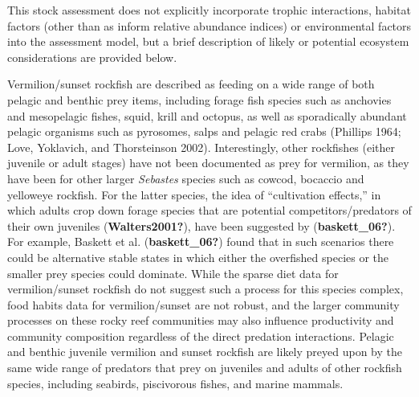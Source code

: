 \documentclass[11pt,
  english,
  a4paper,
]{article}
\begin{document}
This stock assessment does not explicitly incorporate trophic interactions, habitat factors (other than as inform relative abundance indices) or environmental factors into the assessment model, but a brief description of likely or potential ecosystem considerations are provided below.

\leavevmode\tagmcend\tagstructend\par


Vermilion/sunset rockfish are described as feeding on a wide range of both pelagic and benthic prey items, including forage fish species such as anchovies and mesopelagic fishes, squid, krill and octopus, as well as sporadically abundant pelagic organisms such as pyrosomes, salps and pelagic red crabs {(Phillips 1964; Love, Yoklavich, and Thorsteinson 2002)\leavevmode\tagmcend\tagstructend}. Interestingly, other rockfishes (either juvenile or adult stages) have not been documented as prey for vermilion, as they have been for other larger \emph{Sebastes} species such as cowcod, bocaccio and yelloweye rockfish. For the latter species, the idea of ``cultivation effects,'' in which adults crop down forage species that are potential competitors/predators of their own juveniles {(\textbf{Walters2001?})\leavevmode\tagmcend\tagstructend}, have been suggested by {(\textbf{baskett\_06?})\leavevmode\tagmcend\tagstructend}. For example, Baskett et al. {(\textbf{baskett\_06?})\leavevmode\tagmcend\tagstructend} found that in such scenarios there could be alternative stable states in which either the overfished species or the smaller prey species could dominate. While the sparse diet data for vermilion/sunset rockfish do not suggest such a process for this species complex, food habits data for vermilion/sunset are not robust, and the larger community processes on these rocky reef communities may also influence productivity and community composition regardless of the direct predation interactions. Pelagic and benthic juvenile vermilion and sunset rockfish are likely preyed upon by the same wide range of predators that prey on juveniles and adults of other rockfish species, including seabirds, piscivorous fishes, and marine mammals.

\leavevmode\tagmcend\tagstructend\par
\end{document}
